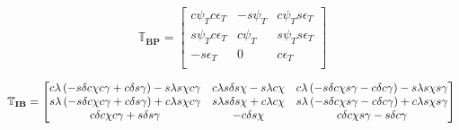 \begin{equation} \label{eq:BPtrans}
\mathbb{T}_{\mathbf{BP}}=
\begin{bmatrix}
c\psi_{T}c\epsilon_{T} & -s\psi_{T} & c\psi_{T}s\epsilon_{T}\\
s\psi_{T}c\epsilon_{T} & c\psi_{T} & s\psi_{T}s\epsilon_{T}\\
-s\epsilon_{T} & 0 & c\epsilon_{T}\\
\end{bmatrix}
\end{equation}

\begin{equation} \label{eq:IBtrans}
\mathbb{T}_{\mathbf{IB}}=
\left[
\begin{matrix}
c\lambda\left(-s\delta c\chi c\gamma +c\delta s\gamma \right)-s\lambda s\chi c\gamma  & c\lambda s\delta s\chi -s\lambda c\chi & c\lambda\left(-s\delta c\chi s\gamma -c\delta c\gamma \right)-s\lambda s\chi s\gamma \\
s\lambda\left(-s\delta c\chi c\gamma +c\delta s\gamma \right)+c\lambda s\chi c\gamma & s\lambda s\delta s\chi +c\lambda c\chi & s\lambda\left(-s\delta c\chi s\gamma -c\delta c\gamma \right)+c\lambda s\chi s\gamma \\
c\delta c\chi c\gamma +s\delta s\gamma &  -c\delta s\chi &  c\delta c\chi s\gamma -s\delta c\gamma \\
\end{matrix}
\right]\\
\end{equation}



